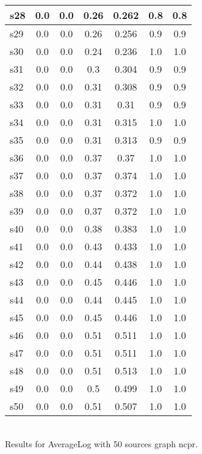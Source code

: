 \documentclass{article}
\begin{document}
\begin{tabular}{|l|c|c|c|c|c|c|}
\hline
s28 &0.0 & 0.0 & 0.26 & 0.262 & 0.8 & 0.8\\
\hline
s29 &0.0 & 0.0 & 0.26 & 0.256 & 0.9 & 0.9\\
\hline
s30 &0.0 & 0.0 & 0.24 & 0.236 & 1.0 & 1.0\\
\hline
s31 &0.0 & 0.0 & 0.3 & 0.304 & 0.9 & 0.9\\
\hline
s32 &0.0 & 0.0 & 0.31 & 0.308 & 0.9 & 0.9\\
\hline
s33 &0.0 & 0.0 & 0.31 & 0.31 & 0.9 & 0.9\\
\hline
s34 &0.0 & 0.0 & 0.31 & 0.315 & 1.0 & 1.0\\
\hline
s35 &0.0 & 0.0 & 0.31 & 0.313 & 0.9 & 0.9\\
\hline
s36 &0.0 & 0.0 & 0.37 & 0.37 & 1.0 & 1.0\\
\hline
s37 &0.0 & 0.0 & 0.37 & 0.374 & 1.0 & 1.0\\
\hline
s38 &0.0 & 0.0 & 0.37 & 0.372 & 1.0 & 1.0\\
\hline
s39 &0.0 & 0.0 & 0.37 & 0.372 & 1.0 & 1.0\\
\hline
s40 &0.0 & 0.0 & 0.38 & 0.383 & 1.0 & 1.0\\
\hline
s41 &0.0 & 0.0 & 0.43 & 0.433 & 1.0 & 1.0\\
\hline
s42 &0.0 & 0.0 & 0.44 & 0.438 & 1.0 & 1.0\\
\hline
s43 &0.0 & 0.0 & 0.45 & 0.446 & 1.0 & 1.0\\
\hline
s44 &0.0 & 0.0 & 0.44 & 0.445 & 1.0 & 1.0\\
\hline
s45 &0.0 & 0.0 & 0.45 & 0.446 & 1.0 & 1.0\\
\hline
s46 &0.0 & 0.0 & 0.51 & 0.511 & 1.0 & 1.0\\
\hline
s47 &0.0 & 0.0 & 0.51 & 0.511 & 1.0 & 1.0\\
\hline
s48 &0.0 & 0.0 & 0.51 & 0.513 & 1.0 & 1.0\\
\hline
s49 &0.0 & 0.0 & 0.5 & 0.499 & 1.0 & 1.0\\
\hline
s50 &0.0 & 0.0 & 0.51 & 0.507 & 1.0 & 1.0\\
\hline
\end{tabular}\\

\noindent Results for AverageLog with 50 sources graph ncpr.
\end{document}

